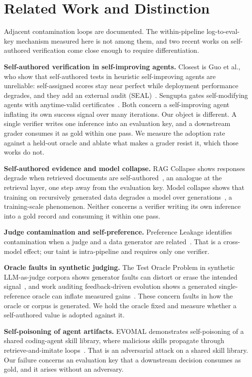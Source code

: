 \documentclass[conference]{IEEEtran}
\begin{document}
\section{Related Work and Distinction}
Adjacent contamination loops are documented. The within-pipeline log-to-eval-key mechanism measured
here is not among them, and two recent works on self-authored verification come close enough to
require differentiation.

\textbf{Self-authored verification in self-improving agents.} Closest is Guo et al., who show that
self-authored tests in heuristic self-improving agents are unreliable: self-assigned scores stay
near perfect while deployment performance degrades, and they add an external audit
(SEAL)~\cite{selfauthored}. Sengupta gates self-modifying agents with anytime-valid
certificates~\cite{seacert}. Both concern a self-improving agent inflating its own success signal
over many iterations. Our object is different. A single verifier writes one inference into an
evaluation key, and a downstream grader consumes it as gold within one pass. We measure the
adoption rate against a held-out oracle and ablate what makes a grader resist it, which those works
do not.

\textbf{Self-authored evidence and model collapse.} RAG Collapse shows responses degrade when
retrieved documents are self-authored~\cite{ragcollapse}, an analogue at the retrieval layer, one
step away from the evaluation key. Model collapse shows that training on recursively generated data
degrades a model over generations~\cite{modelcollapse}, a training-scale phenomenon. Neither
concerns a verifier writing its own inference into a gold record and consuming it within one pass.

\textbf{Judge contamination and self-preference.} Preference Leakage identifies contamination when a
judge and a data generator are related~\cite{prefleak}. That is a cross-model effect; our taint is
intra-pipeline and requires only one verifier.

\textbf{Oracle faults in synthetic judging.} The Test Oracle Problem in synthetic LLM-as-judge
corpora shows generator faults can distort or erase the intended signal~\cite{oracleproblem}, and
work auditing feedback-driven evolution shows a generated single-reference oracle can inflate
measured gains~\cite{feedbackevo}. These concern faults in how the oracle or corpus is generated. We
hold the oracle fixed and measure whether a self-authored value is adopted against it.

\textbf{Self-poisoning of agent artifacts.} EVOMAL demonstrates self-poisoning of a shared
coding-agent skill library, where malicious skills propagate through retrieve-and-imitate
loops~\cite{evomal}. That is an adversarial attack on a shared skill library. Our failure concerns
an evaluation key that a downstream decision consumes as gold, and it arises without an adversary.
\end{document}
